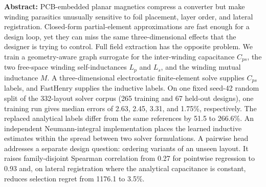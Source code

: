 \documentclass[letterpaper,twocolumn,9pt]{extarticle}
\newcommand{\Cps}{C_{ps}}
\newcommand{\Lp}{L_p}
\newcommand{\Ls}{L_s}
\newcommand{\Mut}{M}
\begin{document}

\noindent\textbf{Abstract:} PCB-embedded planar magnetics compress a converter but make winding parasitics unusually sensitive to foil placement, layer order, and lateral registration. Closed-form partial-element approximations are fast enough for a design loop, yet they can miss the same three-dimensional effects that the designer is trying to control. Full field extraction has the opposite problem. We train a geometry-aware graph surrogate for the inter-winding capacitance $\Cps$, the two free-space winding self-inductances $\Lp$ and $\Ls$, and the winding mutual inductance $\Mut$. A three-dimensional electrostatic finite-element solve supplies $\Cps$ labels, and FastHenry supplies the inductive labels. On one fixed seed-42 random split of the 332-layout solver corpus (265 training and 67 held-out designs), one training run gives median errors of 2.63, 2.45, 3.31, and 1.75\%, respectively. The replaced analytical labels differ from the same references by 51.5 to 266.6\%. An independent Neumann-integral implementation places the learned inductive estimates within the spread between two solver formulations. A pairwise head addresses a separate design question: ordering variants of an unseen layout. It raises family-disjoint Spearman correlation from 0.27 for pointwise regression to 0.93 and, on lateral registration where the analytical capacitance is constant, reduces selection regret from 1176.1 to 3.5\%.
\end{document}
